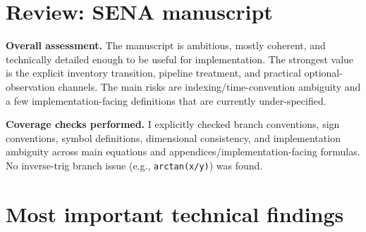 \documentclass[11pt]{article}
\begin{document}
\section*{Review: SENA manuscript}

\textbf{Overall assessment.}
The manuscript is ambitious, mostly coherent, and technically detailed enough to be useful for implementation.
The strongest value is the explicit inventory transition, pipeline treatment, and practical optional-observation channels.
The main risks are indexing/time-convention ambiguity and a few implementation-facing definitions that are currently under-specified.

\textbf{Coverage checks performed.}
I explicitly checked branch conventions, sign conventions, symbol definitions, dimensional consistency, and implementation ambiguity across main equations and appendices/implementation-facing formulas.
No inverse-trig branch issue (e.g., \texttt{arctan(x/y)}) was found.

\section*{Most important technical findings}
\end{document}
